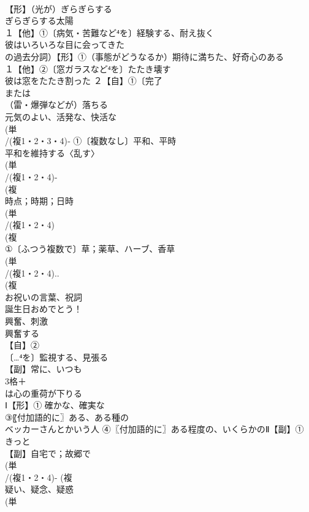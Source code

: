 \documentclass[8pt]{extreport}
\begin{document}
\begin{CJK}{UTF8}{min}
\\	【形】（光が）ぎらぎらする 
\\	ぎらぎらする太陽
\\	１【他】①〔病気・苦難など⁴を〕経験する、耐え抜く 
\\	彼はいろいろな目に会ってきた 
\\	の過去分詞）【形】①（事態がどうなるか）期待に満ちた、好奇心のある
\\	１【他】②〔窓ガラスなど⁴を〕たたき壊す 
\\	彼は窓をたたき割った ２【自】①〔完了
\\	または
\\	（雷・爆弾などが）落ちる 
\\	元気のよい、活発な、快活な 
\\	(単
\\	/(複1・2・3・4)‐ ①〔複数なし〕平和、平時 
\\	平和を維持する〈乱す〉
\\	(単
\\	/(複1・2・4)-
\\	(複
\\	時点；時期；日時
\\	(単
\\	/(複1・2・4)
\\	(複
\\	①〔ふつう複数で〕草；薬草、ハーブ、香草 
\\	(単
\\	/(複1・2・4)..
\\	(複
\\	お祝いの言葉、祝詞 
\\	誕生日おめでとう！
\\	興奮、刺激 
\\	興奮する
\\	【自】②
\\	〔…⁴を〕監視する、見張る
\\	【副】常に、いつも 
\\	3格＋
\\	は心の重荷が下りる
\\	Ⅰ【形】① 確かな、確実な 
\\	③〖付加語的に〗ある、ある種の 
\\	ベッカーさんとかいう人 ④〖付加語的に〗ある程度の、いくらかのⅡ【副】① きっと 
\\	【副】自宅で；故郷で 
\\	(単
\\	/(複1・2・4)- (複
\\	疑い、疑念、疑惑 
\\	(単

\end{CJK}
\end{document}
